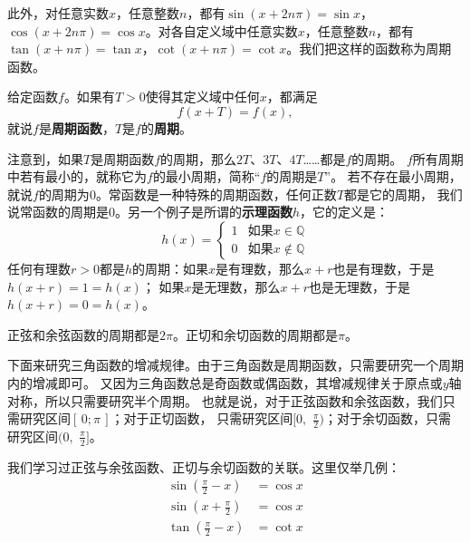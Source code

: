 \documentclass[12pt,UTF8]{ctexbook}
\begin{document}
此外，对任意实数$x$，任意整数$n$，都有$\sin(x+2n\pi) = \sin{x}$，$\cos(x+2n\pi) = \cos{x}$。对各自定义域中任意实数$x$，任意整数$n$，都有$\tan(x+n\pi) = \tan{x}$，$\cot(x+n\pi) = \cot{x}$。我们把这样的函数称为周期函数。
\begin{df}
    给定函数$f$。如果有$T>0$使得其定义域中任何$x$，都满足
    $$ f(x + T) = f(x),$$
    就说$f$是\textbf{周期函数}，$T$是$f$的\textbf{周期}。
\end{df}
注意到，如果$T$是周期函数$f$的周期，那么$2T$、$3T$、$4T$……都是$f$的周期。
$f$所有周期中若有最小的，就称它为$f$的最小周期，简称“$f$的周期是$T$”。
若不存在最小周期，就说$f$的周期为$0$。常函数是一种特殊的周期函数，任何正数$T$都是它的周期，
我们说常函数的周期是$0$。另一个例子是所谓的\textbf{示理函数}$h$，它的定义是：
$$
h(x) = \left\{
        \begin{array}{cc}
        1 & \mbox{如果}x\in\mathbb{Q} \\
        0 & \mbox{如果}x\notin\mathbb{Q} 
        \end{array}
    \right.
$$
任何有理数$r>0$都是$h$的周期：如果$x$是有理数，那么$x+r$也是有理数，于是$h(x+r) = 1 = h(x)$；
如果$x$是无理数，那么$x+r$也是无理数，于是$h(x+r) = 0 = h(x)$。

正弦和余弦函数的周期都是$2\pi$。正切和余切函数的周期都是$\pi$。

下面来研究三角函数的增减规律。由于三角函数是周期函数，只需要研究一个周期内的增减即可。
又因为三角函数总是奇函数或偶函数，其增减规律关于原点或$y$轴对称，所以只需要研究半个周期。
也就是说，对于正弦函数和余弦函数，我们只需研究区间$[\,0;\pi\,]$；对于正切函数，
只需研究区间$[0, \,\,\frac{\pi}{2})$；对于余切函数，只需研究区间$(0, \,\,\frac{\pi}{2}]$。

我们学习过正弦与余弦函数、正切与余切函数的关联。这里仅举几例：
\begin{align*}
    \sin{\left(\frac{\pi}{2} - x\right)} &= \cos{x}  \\
    \sin{\left(x + \frac{\pi}{2}\right)} &= \cos{x}  \\
    \tan{\left(\frac{\pi}{2} - x\right)} &= \cot{x}      
\end{align*}
\end{document}
